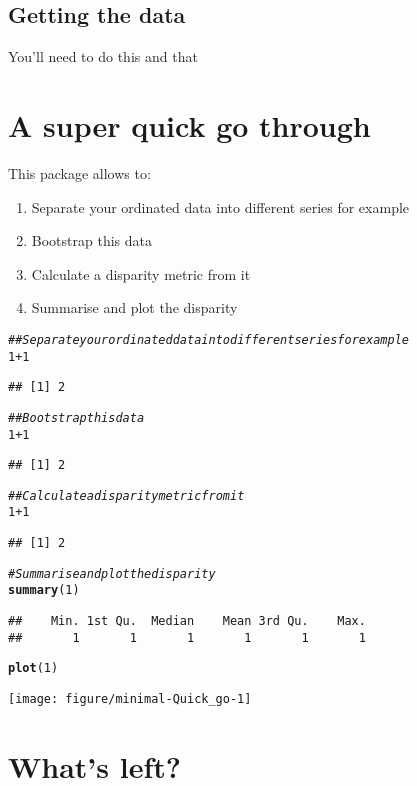 \documentclass{article}\usepackage[]{graphicx}\usepackage[]{color}
\makeatletter
\newcommand{\hlnum}[1]{\textcolor[rgb]{0.686,0.059,0.569}{#1}}%
\newcommand{\hlcom}[1]{\textcolor[rgb]{0.678,0.584,0.686}{\textit{#1}}}%
\newcommand{\hlopt}[1]{\textcolor[rgb]{0,0,0}{#1}}%
\newcommand{\hlstd}[1]{\textcolor[rgb]{0.345,0.345,0.345}{#1}}%
\newcommand{\hlkwd}[1]{\textcolor[rgb]{0.737,0.353,0.396}{\textbf{#1}}}%
\newenvironment{kframe}{%
 \def\at@end@of@kframe{}%
 \ifinner\ifhmode%
  \def\at@end@of@kframe{\end{minipage}}%
  \begin{minipage}{\columnwidth}%
 \fi\fi%
 \def\FrameCommand##1{\hskip\@totalleftmargin \hskip-\fboxsep
 \colorbox{shadecolor}{##1}\hskip-\fboxsep
     \hskip-\linewidth \hskip-\@totalleftmargin \hskip\columnwidth}%
 \MakeFramed {\advance\hsize-\width
   \@totalleftmargin\z@ \linewidth\hsize
   \@setminipage}}%
 {\par\unskip\endMakeFramed%
 \at@end@of@kframe}
\newenvironment{knitrout}{}{} %
\makeatother
\begin{document}
\subsection{Getting the data}
You'll need to do this and that

\section{A super quick go through}
This package allows to:
\begin{enumerate}
    \item Separate your ordinated data into different series for example
    \item Bootstrap this data
    \item Calculate a disparity metric from it
    \item Summarise and plot the disparity
\end{enumerate}

\begin{knitrout}
\color{fgcolor}\begin{kframe}
\begin{alltt}
\hlcom{## Separate your ordinated data into different series for example}
\hlnum{1}\hlopt{+}\hlnum{1}
\end{alltt}
\begin{verbatim}
## [1] 2
\end{verbatim}
\begin{alltt}
\hlcom{## Bootstrap this data}
\hlnum{1}\hlopt{+}\hlnum{1}
\end{alltt}
\begin{verbatim}
## [1] 2
\end{verbatim}
\begin{alltt}
\hlcom{## Calculate a disparity metric from it}
\hlnum{1}\hlopt{+}\hlnum{1}
\end{alltt}
\begin{verbatim}
## [1] 2
\end{verbatim}
\begin{alltt}
\hlcom{# Summarise and plot the disparity}
\hlkwd{summary}\hlstd{(}\hlnum{1}\hlstd{)}
\end{alltt}
\begin{verbatim}
##    Min. 1st Qu.  Median    Mean 3rd Qu.    Max. 
##       1       1       1       1       1       1
\end{verbatim}
\begin{alltt}
\hlkwd{plot}\hlstd{(}\hlnum{1}\hlstd{)}
\end{alltt}
\end{kframe}

{\centering \texttt{[image: figure/minimal-Quick\_go-1]} 

}



\end{knitrout}

\section{What's left?}
\label{whatsleft}
\end{document}
